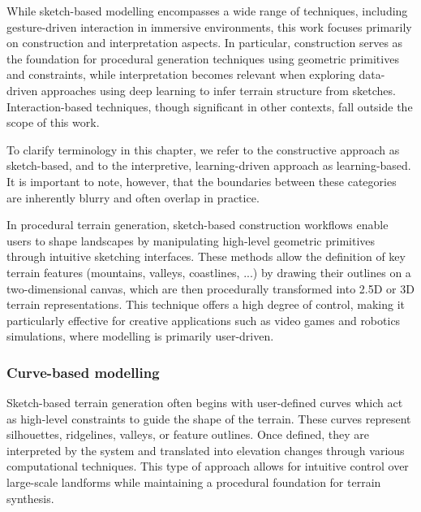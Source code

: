 While sketch-based modelling encompasses a wide range of techniques, including gesture-driven interaction in immersive environments, this work focuses primarily on construction and interpretation aspects. In particular, construction serves as the foundation for procedural generation techniques using geometric primitives and constraints, while interpretation becomes relevant when exploring data-driven approaches using deep learning to infer terrain structure from sketches. Interaction-based techniques, though significant in other contexts, fall outside the scope of this work.

To clarify terminology in this chapter, we refer to the constructive approach as sketch-based, and to the interpretive, learning-driven approach as learning-based. It is important to note, however, that the boundaries between these categories are inherently blurry and often overlap in practice.

In procedural terrain generation, sketch-based construction workflows enable users to shape landscapes by manipulating high-level geometric primitives through intuitive sketching interfaces. These methods allow the definition of key terrain features (mountains, valleys, coastlines, ...) by drawing their outlines on a two-dimensional canvas, which are then procedurally transformed into 2.5D or 3D terrain representations. This technique offers a high degree of control, making it particularly effective for creative applications such as video games and robotics simulations, where modelling is primarily user-driven.

\subsubsection{Curve-based modelling}

Sketch-based terrain generation often begins with user-defined curves which act as high-level constraints to guide the shape of the terrain. These curves represent silhouettes, ridgelines, valleys, or feature outlines. Once defined, they are interpreted by the system and translated into elevation changes through various computational techniques. This type of approach allows for intuitive control over large-scale landforms while maintaining a procedural foundation for terrain synthesis.

